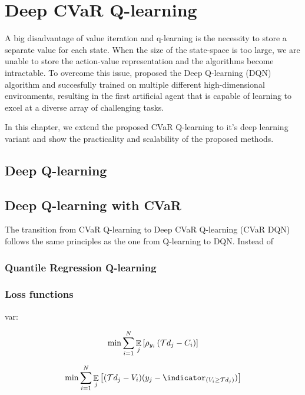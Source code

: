 \chapter{Deep CVaR Q-learning}\label{ch:dqn}

A big disadvantage of value iteration and q-learning is the necessity to store a separate value for each state. When the size of the state-space is too large, we are unable to store the action-value representation and the algorithms become intractable. To overcome this issue, \citet{mnih2015human} proposed the Deep Q-learning (DQN) algorithm and succesfully trained on multiple different high-dimensional environments, resulting in the first artificial agent that is capable of learning to excel at a diverse array of challenging tasks.

In this chapter, we extend the proposed CVaR Q-learning to it's deep learning variant and show the practicality and scalability of the proposed methods.

\section{Deep Q-learning}



\section{Deep Q-learning with CVaR}
The transition from CVaR Q-learning to Deep CVaR Q-learning (CVaR DQN) follows the same principles as the one from Q-learning to DQN. Instead of

\subsection{Quantile Regression Q-learning}


\subsection{Loss functions}

var:

\begin{equation}
\min \sum_{i=1}^{N} \mathop{\mathbb{E}}_j\left[ {\rho_{y_i}\left( {\mathcal{T} d_j - C_i} \right)} \right]
\end{equation}

\begin{equation}
\min \sum_{i=1}^{N} \expect_j\bsquare{(\cT d_j - V_i)(y_j - \indicator_{(V_i \ge \cT d_j)})}
\end{equation}

